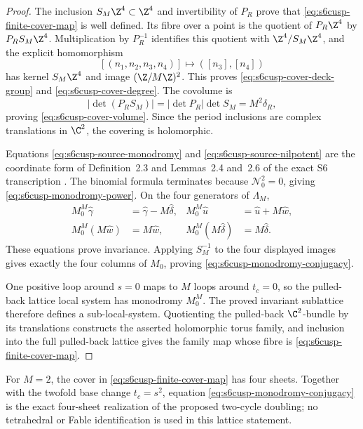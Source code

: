 \begin{proof}
The inclusion \(S_M\Z^4\subset\Z^4\) and invertibility of \(P_R\) prove
that \eqref{eq:s6cusp-finite-cover-map} is well defined.  Its fibre over a
point is the quotient of \(P_R\Z^4\) by \(P_RS_M\Z^4\).  Multiplication by
\(P_R^{-1}\) identifies this quotient with
\(\Z^4/S_M\Z^4\), and the explicit homomorphism
\[
 [(n_1,n_2,n_3,n_4)]
 \longmapsto([n_3],[n_4])
\]
has kernel \(S_M\Z^4\) and image \((\Z/M\Z)^2\).  This proves
\eqref{eq:s6cusp-cover-deck-group} and
\eqref{eq:s6cusp-cover-degree}.  The covolume is
\[
 |\det(P_RS_M)|=|\det P_R|\det S_M=M^2\delta_R,
\]
proving \eqref{eq:s6cusp-cover-volume}.  Since the period inclusions are
complex translations in \(\C^2\), the covering is holomorphic.

Equations \eqref{eq:s6cusp-source-monodromy} and
\eqref{eq:s6cusp-source-nilpotent} are the coordinate form of
Definition~2.3 and Lemmas~2.4 and~2.6 of the exact S6 transcription
\cite{S6Internal}.  The binomial formula terminates because
\(\mathcal N_0^2=0\), giving
\eqref{eq:s6cusp-monodromy-power}.  On the four generators of
\(\Lambda_M\),
\begin{align*}
 M_0^M\widehat\gamma
 &=\widehat\gamma-M\widehat\delta,&
 M_0^M\widehat u
 &=\widehat u+M\widehat w,\\
 M_0^M(M\widehat w)&=M\widehat w,&
 M_0^M(M\widehat\delta)&=M\widehat\delta.
\end{align*}
These equations prove invariance.  Applying \(S_M^{-1}\) to the four
displayed images gives exactly the four columns of \(M_0\), proving
\eqref{eq:s6cusp-monodromy-conjugacy}.

One positive loop around \(s=0\) maps to \(M\) loops around \(t_c=0\),
so the pulled-back lattice local system has monodromy \(M_0^M\).
The proved invariant sublattice therefore defines a sub-local-system.
Quotienting the pulled-back \(\C^2\)-bundle by its translations constructs
the asserted holomorphic torus family, and inclusion into the full
pulled-back lattice gives the family map whose fibre is
\eqref{eq:s6cusp-finite-cover-map}.
\end{proof}

For \(M=2\), the cover in
\eqref{eq:s6cusp-finite-cover-map} has four sheets.  Together with the
twofold base change \(t_c=s^2\), equation
\eqref{eq:s6cusp-monodromy-conjugacy} is the exact four-sheet realization
of the proposed two-cycle doubling; no tetrahedral or Fable identification
is used in this lattice statement.

